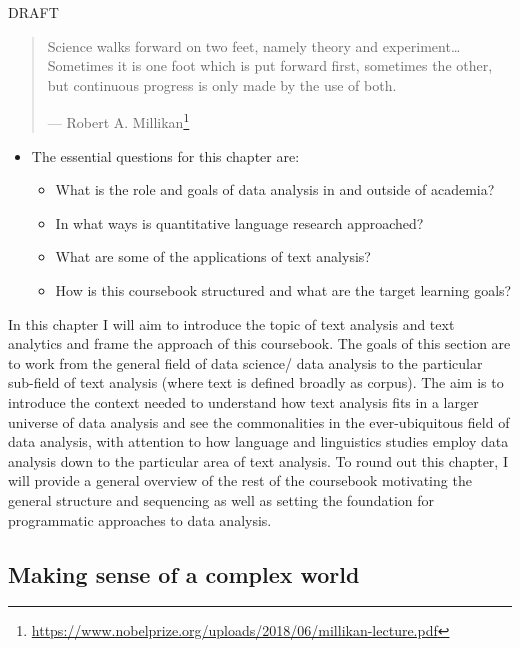\documentclass[
]{article}
\DeclareRobustCommand{\href}[2]{#2\footnote{\url{#1}}}
\providecommand{\tightlist}{%
  \setlength{\itemsep}{0pt}\setlength{\parskip}{0pt}}
\newenvironment{rmdblock}[1]
  {\begin{shaded*}
  \begin{itemize}
  \renewcommand{\labelitemi}{
    \raisebox{-.5\height}[0pt][0pt]{
      {\setkeys{Gin}{width=2em,keepaspectratio}\texttt{[image: assets/images/\#1]}}
    }
  }
  \item
  }
  {
  \end{itemize}
  \end{shaded*}
  }
\newenvironment{rmdkey}
  {\begin{rmdblock}{key}}
  {\end{rmdblock}}
\begin{document}
DRAFT

\begin{quote}
Science walks forward on two feet, namely theory and experiment\ldots Sometimes it is one foot which is put forward first, sometimes the other, but continuous progress is only made by the use of both.

--- \href{https://www.nobelprize.org/uploads/2018/06/millikan-lecture.pdf}{Robert A. Millikan} \citeyearpar{Millikan1923}
\end{quote}

\begin{rmdkey}
The essential questions for this chapter are:

\begin{itemize}
\tightlist
\item
  What is the role and goals of data analysis in and outside of
  academia?
\item
  In what ways is quantitative language research approached?
\item
  What are some of the applications of text analysis?
\item
  How is this coursebook structured and what are the target learning
  goals?
\end{itemize}
\end{rmdkey}

In this chapter I will aim to introduce the topic of text analysis and text analytics and frame the approach of this coursebook. The goals of this section are to work from the general field of data science/ data analysis to the particular sub-field of text analysis (where text is defined broadly as corpus). The aim is to introduce the context needed to understand how text analysis fits in a larger universe of data analysis and see the commonalities in the ever-ubiquitous field of data analysis, with attention to how language and linguistics studies employ data analysis down to the particular area of text analysis. To round out this chapter, I will provide a general overview of the rest of the coursebook motivating the general structure and sequencing as well as setting the foundation for programmatic approaches to data analysis.

\hypertarget{making-sense-of-a-complex-world}{%
\subsection{Making sense of a complex world}\label{making-sense-of-a-complex-world}}
\end{document}

